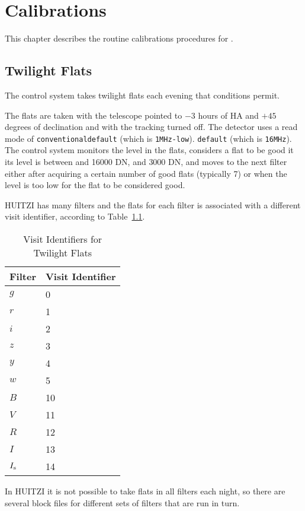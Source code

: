 \chapter{Calibrations}

This chapter describes the routine calibrations procedures for {\projectname}.

\section{Twilight Flats}

The control system takes twilight flats each evening that conditions permit.

The flats are taken with the telescope pointed to $-3$ hours of HA and $+45$ degrees of declination and with the tracking turned off. 
The detector uses a read mode of
\ifcoatli
\verb|conventionaldefault| (which is \verb|1MHz-low|).
\fi
\ifddoti
\verb|default| (which is \verb|16MHz|).
\fi
The control system monitors the level in the flats, considers a flat to be good it its level is between 
 and 16000 DN, 
\fi
{} and 3000 DN,
\fi
and moves to the next filter either after acquiring a certain number of good flats (typically 7) or when the level is too low for the flat to be considered good.

\ifcoatli
HUITZI has many filters and the flats for each filter is associated with a different visit identifier, according to Table~\ref{table:twilight-flats-visits}.


\begin{table}
\begin{center}
\caption{Visit Identifiers for Twilight Flats}
\label{table:twilight-flats-visits}
\medskip
\begin{tabular}{ll}
\hline
Filter&Visit Identifier\\
\hline
$g$&0\\
$r$&1\\
$i$&2\\
$z$&3\\
$y$&4\\
$w$&5\\
$B$&10\\
$V$&11\\
$R$&12\\
$I$&13\\
$\mbox{$I_\mathrm{s}$}$&14\\
\hline
\end{tabular}
\end{center}
\end{table}

In HUITZI it is not possible to take flats in all filters each night, so there are several block files for different sets of filters that are run in turn.

\fi